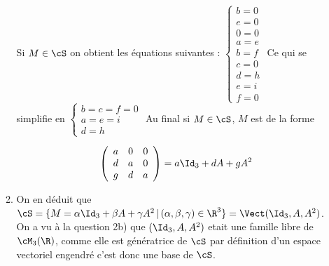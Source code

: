 \begin{correction}
\begin{enumerate}
\begin{enumerate}
Si $M\in \cS$ on obtient les équations suivantes : 
$\left\{ 
\begin{array}{c}
b=0\\
e=0\\
0=0\\
a=e\\
b=f \\
c=0\\
d=h\\
e=i\\
f=0
\end{array}
\right.$
Ce qui se simplifie en
$\left\{ 
\begin{array}{l}
b=c=f=0\\
a=e=i\\
d=h
\end{array}
\right.$
Au final si $M\in \cS$, $M$ est de la forme 

$$\left(\begin{array}{ccc}
a&0&0\\
d&a&0\\
g&d&a
\end{array}
\right)  = a \Id_3 +d A +gA^2$$
\item On en déduit que $\cS =\{ M =  \alpha \Id_3 +\beta A +\gamma A^2\, |\, (\alpha, \beta, \gamma) \in\R^3\} = \Vect( \Id_3, A, A^2)$. On a vu à la question 2b) que $( \Id_3, A, A^2)$ etait une famille libre de $\cM_3(\R)$, comme elle est génératrice de $\cS$ par définition d'un espace vectoriel engendré c'est donc une base de $\cS$. 


 
 

\end{enumerate}
\end{enumerate}
\end{correction}
